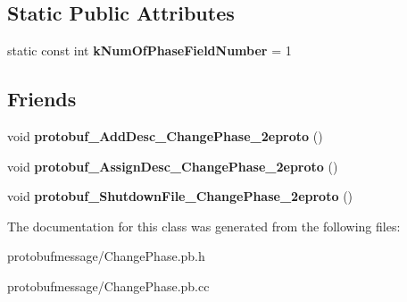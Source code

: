 \subsection*{Static Public Attributes}
\begin{DoxyCompactItemize}
\item 
\hypertarget{class_change_phase_a19b42121df5751cc03a51d1244186f6b}{static const int {\bfseries k\-Num\-Of\-Phase\-Field\-Number} = 1}\label{class_change_phase_a19b42121df5751cc03a51d1244186f6b}

\end{DoxyCompactItemize}
\subsection*{Friends}
\begin{DoxyCompactItemize}
\item 
\hypertarget{class_change_phase_a4647c51e7b88278f5694cd14cbc5e191}{void {\bfseries protobuf\-\_\-\-Add\-Desc\-\_\-\-Change\-Phase\-\_\-2eproto} ()}\label{class_change_phase_a4647c51e7b88278f5694cd14cbc5e191}

\item 
\hypertarget{class_change_phase_a1fdbab9f17b7cba7ac51b7d21e9a0700}{void {\bfseries protobuf\-\_\-\-Assign\-Desc\-\_\-\-Change\-Phase\-\_\-2eproto} ()}\label{class_change_phase_a1fdbab9f17b7cba7ac51b7d21e9a0700}

\item 
\hypertarget{class_change_phase_a20ac3c1c2ccf4bf4b4a4f0841d1258f7}{void {\bfseries protobuf\-\_\-\-Shutdown\-File\-\_\-\-Change\-Phase\-\_\-2eproto} ()}\label{class_change_phase_a20ac3c1c2ccf4bf4b4a4f0841d1258f7}

\end{DoxyCompactItemize}


The documentation for this class was generated from the following files\-:\begin{DoxyCompactItemize}
\item 
protobufmessage/Change\-Phase.\-pb.\-h\item 
protobufmessage/Change\-Phase.\-pb.\-cc\end{DoxyCompactItemize}
